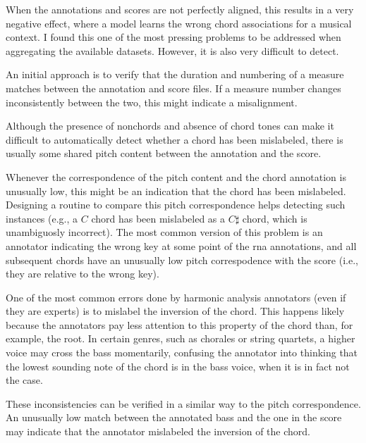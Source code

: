 



When the annotations and scores are not perfectly aligned,
this results in a very negative effect, where a model learns
the wrong chord associations for a musical context. I found
this one of the most pressing problems to be addressed when
aggregating the available datasets. However, it is also very
difficult to detect.

An initial approach is to verify that the duration and
numbering of a measure matches between the annotation and
score files. If a measure number changes inconsistently
between the two, this might indicate a misalignment.


Although the presence of \gls{nonchord}s and absence of
chord tones can make it difficult to automatically detect
whether a chord has been mislabeled, there is usually some
shared pitch content between the annotation and the score.

Whenever the correspondence of the pitch content and the
chord annotation is unusually low, this might be an
indication that the chord has been mislabeled. Designing a
routine to compare this pitch correspondence helps detecting
such instances (e.g., a $C$ chord has been mislabeled as a
$C\sharp$ chord, which is unambiguosly incorrect). The most
common version of this problem is an annotator indicating
the wrong key at some point of the \gls{rna} annotations,
and all subsequent chords have an unusually low pitch
correspodence with the score (i.e., they are relative to the
wrong key).



One of the most common errors done by harmonic analysis
annotators (even if they are experts) is to mislabel the
inversion of the chord. This happens likely because the
annotators pay less attention to this property of the chord
than, for example, the root. In certain genres, such as
chorales or string quartets, a higher voice may cross the
bass momentarily, confusing the annotator into thinking that
the lowest sounding note of the chord is in the bass voice,
when it is in fact not the case.

These inconsistencies can be verified in a similar way to
the pitch correspondence. An unusually low match between the
annotated bass and the one in the score may indicate that
the annotator mislabeled the inversion of the chord.
